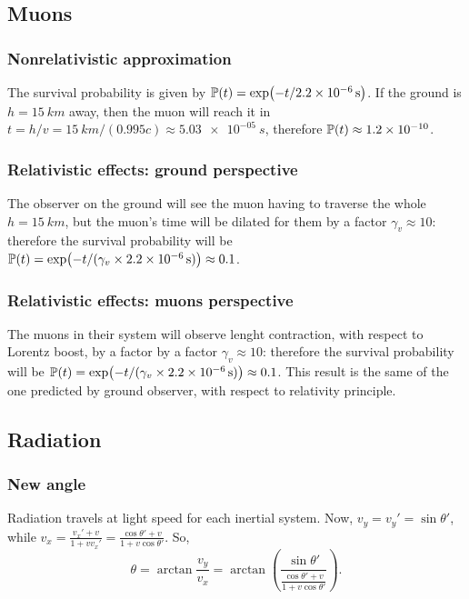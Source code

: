 \documentclass[main.tex]{subfiles}
\begin{document}
\subsection{Muons}

\subsubsection{Nonrelativistic approximation}

The survival probability is given by \(\mathbb{P} (t) = \exp(-t/ \SI{2.2e-6}{s})\). If the ground is \( h =\SI{15}{km} \) away, then the muon will reach it in \(t = h/v = \SI{15}{km} / (0.995c) \approx \SI{5.03e-05}{s}\), therefore \(\mathbb{P}(t) \approx \num{1.2e-10} \).

\subsubsection{Relativistic effects: ground perspective}

The observer on the ground will see the muon having to traverse the whole \(h = \SI{15}{km} \), but the muon's time will be dilated for them by a factor \(\gamma_v \approx 10\): therefore the survival probability
will be \(\mathbb{P}(t) = \exp(- t / (\gamma_v \times \SI{2.2e-6}{s})) \approx 0.1\).


\subsubsection{Relativistic effects: muons perspective}

The muons in their system will observe lenght contraction, with respect to Lorentz boost, by a factor by a factor \(\gamma_v \approx 10\): therefore the survival probability
will be \(\mathbb{P}(t) = \exp(- t / (\gamma_v \times \SI{2.2e-6}{s})) \approx 0.1\). This result is the same of the one predicted by ground observer, with respect to relativity principle.
\subsection{Radiation}

\subsubsection{New angle}
Radiation travels at light speed for each inertial system. Now, $v_y=v_y'=\sin\theta'$, while $v_x=\frac{v_x'+v}{1+vv_x'}=\frac{\cos\theta'+v}{1+v\cos\theta'}$. So,
\begin{equation}
\theta=\arctan\frac{v_y}{v_x}=\arctan\left(\frac{\sin\theta'}{\frac{\cos\theta'+v}{1+v\cos\theta'}}\right).
\end{equation}
\end{document}
